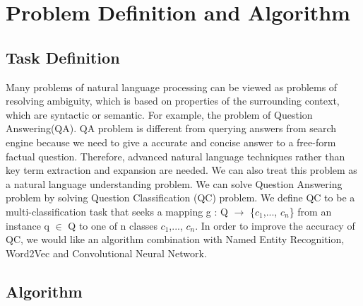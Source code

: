 \documentclass[10pt,twocolumn,letterpaper]{article}
\begin{document}
\section{Problem Definition and Algorithm}
\subsection{Task Definition}
Many problems of natural language processing can be viewed as problems of resolving ambiguity, which is based on properties of the surrounding context, which are syntactic or semantic. For example, the problem of Question Answering(QA). QA problem is different from querying answers from search engine because we need to give a accurate and concise answer to a free-form factual question. Therefore, advanced natural language techniques rather than key term extraction and expansion are needed. We can also treat this problem as a natural language understanding problem. We can solve Question Answering problem by solving Question Classification (QC) problem. We define QC to be a multi-classification task that seeks a mapping g : Q $\rightarrow$ \{${c_1}$,..., ${c_n}$\} from an instance q $\in$ Q to one of n classes ${c_1}$,..., ${c_n}$. In order to improve the accuracy of QC, we would like an algorithm combination with Named Entity Recognition, Word2Vec and Convolutional Neural Network.

\subsection{Algorithm}
\end{document}

